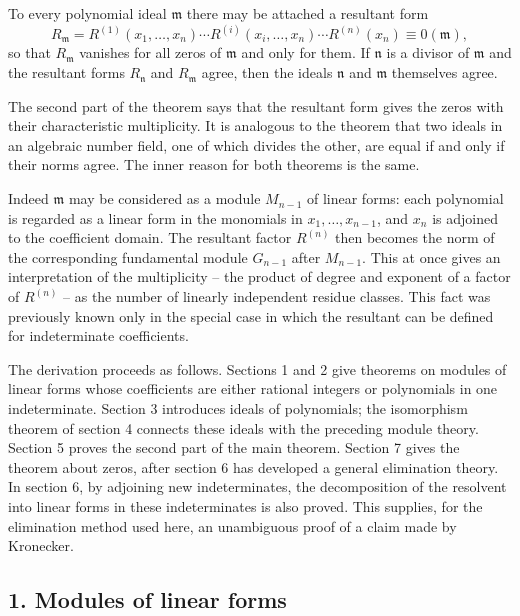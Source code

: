 \documentclass[11pt]{article}
\begin{document}
To every polynomial ideal $\mathfrak m$ there may be attached a resultant form
\begin{equation}
  R_{\mathfrak m}=R^{(1)}(x_1,\ldots,x_n)\cdots R^{(i)}(x_i,\ldots,x_n)\cdots R^{(n)}(x_n)\equiv 0(\mathfrak m),       \tag{A}
\end{equation}
so that $R_{\mathfrak m}$ vanishes for all zeros of $\mathfrak m$ and only for them. If $\mathfrak n$ is a divisor of $\mathfrak m$ and the resultant forms $R_{\mathfrak n}$ and $R_{\mathfrak m}$ agree, then the ideals $\mathfrak n$ and $\mathfrak m$ themselves agree.

The second part of the theorem says that the resultant form gives the zeros with their characteristic multiplicity. It is analogous to the theorem that two ideals in an algebraic number field, one of which divides the other, are equal if and only if their norms agree. The inner reason for both theorems is the same.

Indeed $\mathfrak m$ may be considered as a module $M_{n-1}$ of linear forms: each polynomial is regarded as a linear form in the monomials in $x_1,\ldots,x_{n-1}$, and $x_n$ is adjoined to the coefficient domain. The resultant factor $R^{(n)}$ then becomes the norm of the corresponding fundamental module $G_{n-1}$ after $M_{n-1}$. This at once gives an interpretation of the multiplicity -- the product of degree and exponent of a factor of $R^{(n)}$ -- as the number of linearly independent residue classes. This fact was previously known only in the special case in which the resultant can be defined for indeterminate coefficients.

The derivation proceeds as follows. Sections 1 and 2 give theorems on modules of linear forms whose coefficients are either rational integers or polynomials in one indeterminate. Section 3 introduces ideals of polynomials; the isomorphism theorem of section 4 connects these ideals with the preceding module theory. Section 5 proves the second part of the main theorem. Section 7 gives the theorem about zeros, after section 6 has developed a general elimination theory. In section 6, by adjoining new indeterminates, the decomposition of the resolvent into linear forms in these indeterminates is also proved. This supplies, for the elimination method used here, an unambiguous proof of a claim made by Kronecker.

\subsection{1. Modules of linear forms}
\end{document}
